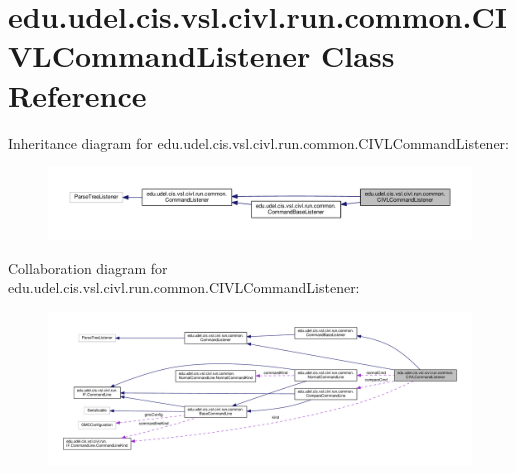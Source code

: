 \hypertarget{classedu_1_1udel_1_1cis_1_1vsl_1_1civl_1_1run_1_1common_1_1CIVLCommandListener}{}\section{edu.\+udel.\+cis.\+vsl.\+civl.\+run.\+common.\+C\+I\+V\+L\+Command\+Listener Class Reference}
\label{classedu_1_1udel_1_1cis_1_1vsl_1_1civl_1_1run_1_1common_1_1CIVLCommandListener}


Inheritance diagram for edu.\+udel.\+cis.\+vsl.\+civl.\+run.\+common.\+C\+I\+V\+L\+Command\+Listener\+:
\nopagebreak
\begin{figure}[H]
\begin{center}
\leavevmode
\includegraphics[width=350pt]{classedu_1_1udel_1_1cis_1_1vsl_1_1civl_1_1run_1_1common_1_1CIVLCommandListener__inherit__graph}
\end{center}
\end{figure}


Collaboration diagram for edu.\+udel.\+cis.\+vsl.\+civl.\+run.\+common.\+C\+I\+V\+L\+Command\+Listener\+:
\nopagebreak
\begin{figure}[H]
\begin{center}
\leavevmode
\includegraphics[width=350pt]{classedu_1_1udel_1_1cis_1_1vsl_1_1civl_1_1run_1_1common_1_1CIVLCommandListener__coll__graph}
\end{center}
\end{figure}
